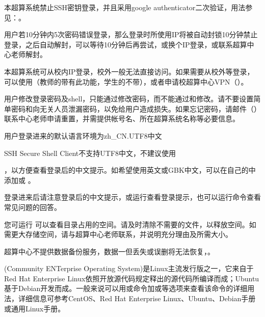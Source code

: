 \documentclass[a4paper,12pt,english]{sphinxmanual}
\begin{document}
\sphinxAtStartPar
本超算系统禁止SSH密钥登录，并且采用google authenticator二次验证，用法参见：。

\sphinxAtStartPar
用户若10分钟内5次密码错误登录，那么登录时所使用IP将被自动封锁10分钟禁止登录，之后自动解封，可以等待10分钟后再尝试，或换个IP登录，或联系超算中心老师解封。

\sphinxAtStartPar
本超算系统可从校内IP登录，校外一般无法直接访问。如果需要从校外等登录，可以使用（教师的带有此功能，学生的不带），或者申请校超算中心VPN（）。

\sphinxAtStartPar
用户修改登录密码及shell，只能通过修改密码，而不能通过和修改。请不要设置简单密码和向无关人员泄漏密码，以免给用户造成损失。如果忘记密码，请邮件（）联系中心老师申请重置，并需提供帐号名、所在超算系统名称等必要信息。

\sphinxAtStartPar
用户登录进来的默认语言环境为zh\_CN.UTF\sphinxhyphen{}8中文 %
\begin{footnote}[2]\sphinxAtStartFootnote
SSH Secure Shell Client不支持UTF\sphinxhyphen{}8中文，不建议使用
%
\end{footnote}，以方便查看登录后的中文提示。如希望使用英文或GBK中文，可以在自己的中添加或 。

\sphinxAtStartPar
登录进来后请注意登录后的中文提示，或运行查看登录提示，也可以运行命令查看常见问题的回答。

\sphinxAtStartPar
您可运行 可以查看目录占用的空间。请及时清除不需要的文件，以释放空间。如需更大存储空间，请与超算中心老师联系，并说明充分理由及所需大小。

\sphinxAtStartPar
超算中心不提供数据备份服务，数据一但丢失或误删将无法恢复，。

\sphinxAtStartPar
{}(Community ENTerprise Operating System)是Linux主流发行版之一，它来自于Red Hat Enterprise Linux依照开放源代码规定释出的源代码所编译而成；Ubuntu基于Debian开发而成。一般来说可以用或命令加或等选项来查看该命令的详细用法，详细信息可参考CentOS、Red Hat Enterprise Linux、Ubuntu、Debian手册或通用Linux手册。
\end{document}
